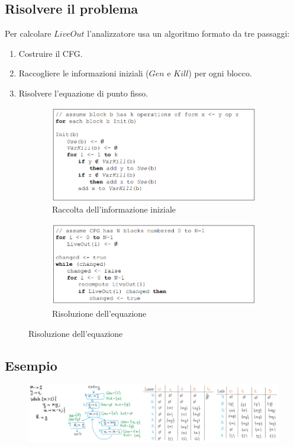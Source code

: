 \documentclass[a4paper,oneside,titlepage]{book}
\begin{document}
\subsection{Risolvere il problema}
Per calcolare $LiveOut$ l'analizzatore usa un algoritmo formato da tre passaggi:
\begin{enumerate}
    \item Costruire il CFG.
    \item Raccogliere le informazioni iniziali ($Gen$ e $Kill$) per ogni blocco.
    \item Risolvere l'equazione di punto fisso.
\end{enumerate}
\begin{figure}[htp]
	\begin{subfigure}{0.49\textwidth}
	    \centering
		\includegraphics[width=\textwidth, height=\textheight, keepaspectratio]{liveness1.png}
		\caption{Raccolta dell'informazione iniziale}
	\end{subfigure}
	\hfill
	\begin{subfigure}{0.49\textwidth}
	    \centering
		\includegraphics[width=\textwidth, height=\textheight, keepaspectratio]{liveness2.png} 
		\caption{Risoluzione dell'equazione}
	\end{subfigure}
\end{figure}

\subsection{Esempio}
\label{live4}
\begin{figure}[htp]
	\centering
	\includegraphics[width=\textwidth, height=\textheight, keepaspectratio]{liveness3.png}
\end{figure}
\end{document}
